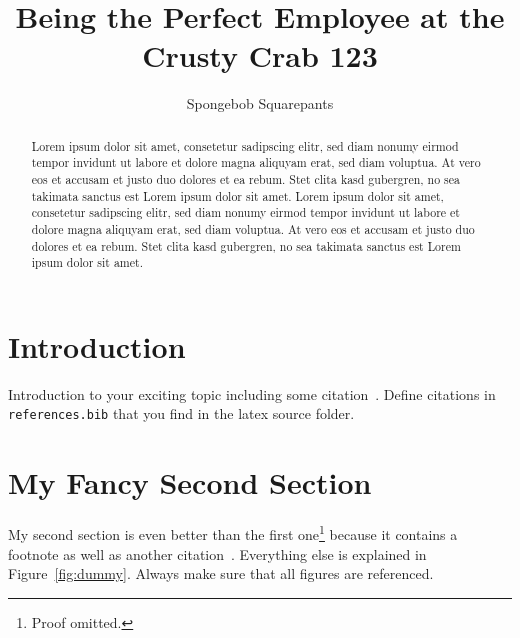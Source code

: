 \documentclass{ACGSeminar}
\begin{document}
\title{Being the Perfect Employee at the Crusty Crab 123}

\author{Spongebob Squarepants}

\maketitle


\begin{abstract}%
Lorem ipsum dolor sit amet, consetetur sadipscing elitr, sed diam nonumy eirmod
tempor invidunt ut labore et dolore magna aliquyam erat, sed diam voluptua. At
vero eos et accusam et justo duo dolores et ea rebum. Stet clita kasd
gubergren, no sea takimata sanctus est Lorem ipsum dolor sit amet. Lorem ipsum
dolor sit amet, consetetur sadipscing elitr, sed diam nonumy eirmod tempor
invidunt ut labore et dolore magna aliquyam erat, sed diam voluptua. At vero
eos et accusam et justo duo dolores et ea rebum. Stet clita kasd gubergren, no
sea takimata sanctus est Lorem ipsum dolor sit amet.
\end{abstract}

\tableofcontents


\section{Introduction}

Introduction to your exciting topic including
some citation~\cite{Plankton2003}. Define citations
in \verb+references.bib+ that you find in
the latex source folder.


\section{My Fancy Second Section}

My second section is even better than the
first one\footnote{Proof omitted.}
because it contains a footnote as well as another
citation~\cite{Plankton2011}. Everything else is
explained in Figure~\ref{fig:dummy}. Always make sure
that all figures are referenced.
\end{document}
